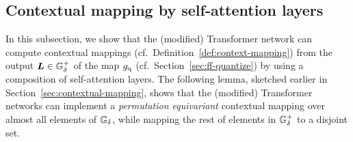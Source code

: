 \subsection{Contextual mapping by self-attention layers}
\vspace*{-3pt}
\label{sec:attn-context}
In this subsection, we show that the (modified) Transformer network can compute contextual mappings (cf.~Definition~\ref{def:context-mapping}) from the output ${\bm{L}} \in {\mathbb{G}}^{+}_{\delta}$ of the map $g_{\rm q}$ (cf.~Section~\ref{sec:ff-quantize}) by using a composition of self-attention layers.
The following lemma, sketched earlier in Section~\ref{sec:contextual-mapping}, shows that the (modified) Transformer networks can implement a \emph{permutation equivariant} contextual mapping over almost all elements of ${\mathbb{G}}_{\delta}$, while mapping the rest of elements in ${\mathbb{G}}^{+}_{\delta}$ to a disjoint set.





